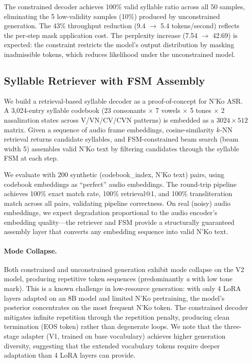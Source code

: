 \documentclass[11pt]{article}
\begin{document}
The constrained decoder achieves 100\% valid syllable ratio across all 50 samples, eliminating the 5 low-validity samples (10\%) produced by unconstrained generation.
The 43\% throughput reduction (9.4 $\to$ 5.4 tokens/second) reflects the per-step mask application cost.
The perplexity increase (7.54 $\to$ 42.69) is expected: the constraint restricts the model's output distribution by masking inadmissible tokens, which reduces likelihood under the unconstrained model.

\subsection{Syllable Retriever with FSM Assembly}

We build a retrieval-based syllable decoder as a proof-of-concept for N'Ko ASR.
A 3,024-entry syllable codebook (23 consonants $\times$ 7 vowels $\times$ 5 tones $\times$ 2 nasalization states across V/VN/CV/CVN patterns) is embedded as a $3024 \times 512$ matrix.
Given a sequence of audio frame embeddings, cosine-similarity $k$-NN retrieval returns candidate syllables, and FSM-constrained beam search (beam width 5) assembles valid N'Ko text by filtering candidates through the syllable FSM at each step.

We evaluate with 200 synthetic (codebook\_index, N'Ko text) pairs, using codebook embeddings as ``perfect'' audio embeddings.
The round-trip pipeline achieves 100\% exact match rate, 100\% retrieval@1, and 100\% transliteration match across all pairs, validating pipeline correctness.
On real (noisy) audio embeddings, we expect degradation proportional to the audio encoder's embedding quality---the retriever and FSM provide a structurally guaranteed assembly layer that converts any embedding sequence into valid N'Ko text.

\paragraph{Mode Collapse.}
Both constrained and unconstrained generation exhibit mode collapse on the V2 model, producing repetitive token sequences (predominantly \textit{{\selectfont a}} with low tone mark).
This is a known challenge in low-resource generation: with only 4 LoRA layers adapted on an 8B model and limited N'Ko pretraining, the model's posterior concentrates on the most frequent N'Ko token.
The constrained decoder mitigates infinite repetition through the repetition penalty, producing clean termination (EOS token) rather than degenerate loops.
We note that the three-stage adapter (V1, trained on base vocabulary) achieves higher generation diversity, suggesting that the extended vocabulary tokens require deeper adaptation than 4 LoRA layers can provide.
\end{document}
